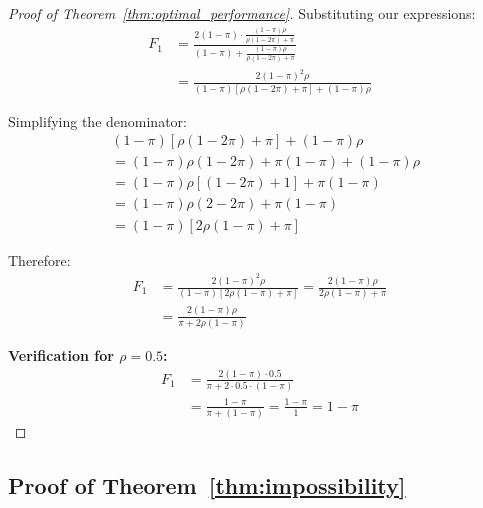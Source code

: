 \documentclass{article} %
\theoremstyle{plain}
\theoremstyle{definition}
\theoremstyle{remark}
\begin{document}
\begin{proof}[Proof of Theorem~\ref{thm:optimal_performance}]
Substituting our expressions:
\begin{align}
F_1 &= \frac{2(1-\pi) \cdot \frac{(1-\pi)\rho}{\rho(1-2\pi) + \pi}}{(1-\pi) + \frac{(1-\pi)\rho}{\rho(1-2\pi) + \pi}} \nonumber \\
&= \frac{2(1-\pi)^2\rho}{(1-\pi)[\rho(1-2\pi) + \pi] + (1-\pi)\rho}
\end{align}

Simplifying the denominator:
\begin{align}
&(1-\pi)[\rho(1-2\pi) + \pi] + (1-\pi)\rho \nonumber \\
&= (1-\pi)\rho(1-2\pi) + \pi(1-\pi) + (1-\pi)\rho \nonumber \\
&= (1-\pi)\rho[(1-2\pi) + 1] + \pi(1-\pi) \nonumber \\
&= (1-\pi)\rho(2-2\pi) + \pi(1-\pi) \nonumber \\
&= (1-\pi)[2\rho(1-\pi) + \pi]
\end{align}

Therefore:
\begin{align}
F_1 &= \frac{2(1-\pi)^2\rho}{(1-\pi)[2\rho(1-\pi) + \pi]} = \frac{2(1-\pi)\rho}{2\rho(1-\pi) + \pi} \nonumber \\
&= \frac{2(1-\pi)\rho}{\pi + 2\rho(1-\pi)}
\end{align}

\textbf{Verification for $\rho = 0.5$:}
\begin{equation}
\begin{aligned}
F_1 &= \frac{2(1-\pi) \cdot 0.5}{\pi + 2 \cdot 0.5 \cdot (1-\pi)} \\
&= \frac{1-\pi}{\pi + (1-\pi)} = \frac{1-\pi}{1} = 1 - \pi
\end{aligned}
\end{equation}

\end{proof}

\subsection{Proof of Theorem~\ref{thm:impossibility}}
\label{appendix:proof_impossibility}
\end{document}
